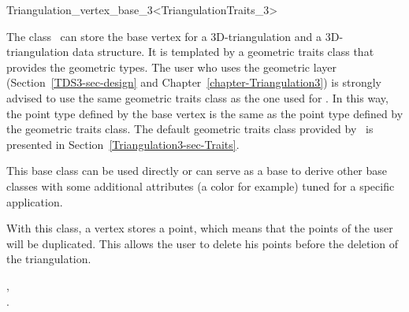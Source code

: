 

\begin{ccRefClass}{Triangulation_vertex_base_3<TriangulationTraits_3>}  %


\ccDefinition

The class \ccRefName\ can store the base vertex for a 3D-triangulation and a 3D-triangulation data structure. It is templated by a
geometric traits class  that provides the geometric
types. The user who uses the geometric layer
(Section~\ref{TDS3-sec-design} and
Chapter~\ref{chapter-Triangulation3}) is strongly advised to use the
same geometric traits class  as the one used for
. In this way, the point type
defined by the base vertex is the same as the point type defined by
the geometric traits class. The default geometric traits class
provided by \cgal\ is presented in
Section~\ref{Triangulation3-sec-Traits}. 

This base class can be used directly or can serve as a base to derive
other base classes with some additional attributes (a color for
example) tuned for a specific application.

With this class, a vertex stores a point, which means that the points
of the user will be duplicated. This allows the user to delete his
points before the deletion of the triangulation.


\ccIsModel


\ccSeeAlso

,\\
.



\end{ccRefClass}


